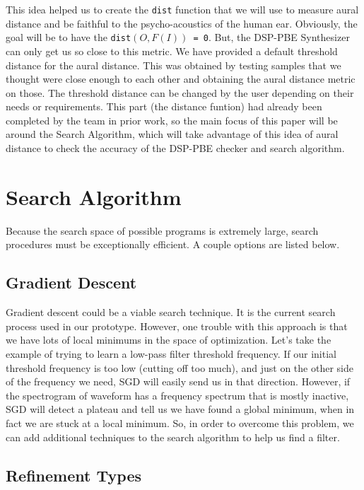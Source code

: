 \documentclass[english, 11pt]{article}
\begin{document}
This idea helped us to create the \texttt{dist} function that we will use to measure aural distance and be faithful to the psycho-acoustics of the human ear. Obviously, the goal will be to have the \texttt{dist$(O, F(I))$ = 0}. But, the DSP-PBE Synthesizer can only get us so close to this metric. We have provided a default threshold distance for the aural distance. This was obtained by testing samples that we thought were close enough to each other and obtaining the aural distance metric on those. The threshold distance can be changed by the user depending on their needs or requirements. This part (the distance funtion) had already been completed by the team in prior work, so the main focus of this paper will be around the Search Algorithm, which will take advantage of this idea of aural distance to check the accuracy of the DSP-PBE checker and search algorithm.

\section{Search Algorithm}

Because the search space of possible programs is extremely large, search procedures must be exceptionally efficient. A couple options are listed below.

\subsection{Gradient Descent}

Gradient descent could be a viable search technique. It is the current search process used in our prototype. However, one trouble with this approach is that we have lots of local minimums in the space of optimization. Let's take the example of trying to learn a low-pass filter threshold frequency. If our initial threshold frequency is too low (cutting off too much), and just on the other side of the frequency we need, SGD will easily send us in that direction. However, if the spectrogram of waveform has a frequency spectrum that is mostly inactive, SGD will detect a plateau and tell us we have found a global minimum, when in fact we are stuck at a local minimum. So, in order to overcome this problem, we can add additional techniques to the search algorithm to help us find a filter.

\subsection{Refinement Types}
\end{document}
